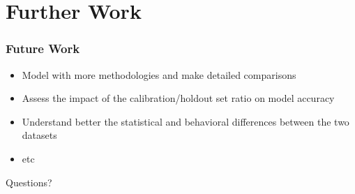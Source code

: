 \documentclass{beamer} %
\theoremstyle{definition} %
\begin{document}
\section{Further Work} %
\begin{frame}
\frametitle{Future Work}
\begin{itemize}
\item Model with more methodologies and make detailed comparisons
\item Assess the impact of the calibration/holdout set ratio on model accuracy
\item Understand better the statistical and behavioral differences between the two datasets
\item etc
\end{itemize}
\end{frame}

\begin{frame}
Questions?
\end{frame}

\end{document}
